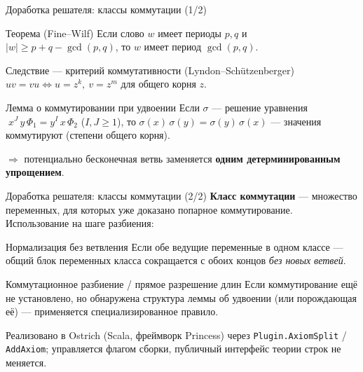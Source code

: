 \documentclass[aspectratio=169,11pt]{beamer}
\renewcommand{\ge}{\geqslant}
\begin{document}
\begin{frame}{Доработка решателя: классы коммутации (1/2)}
  \begin{block}{Теорема (Fine--Wilf)}
    Если слово $w$ имеет периоды $p,q$ и $|w|\ge p+q-\gcd(p,q)$, то $w$ имеет
    период $\gcd(p,q)$.
  \end{block}

  \begin{block}{Следствие --- критерий коммутативности (Lyndon--Sch\"utzenberger)}
    $uv=vu \iff u=z^k,\ v=z^m$ для общего корня $z$.
  \end{block}

  \begin{exampleblock}{Лемма о коммутировании при удвоении}
    Если $\sigma$ --- решение уравнения
    $\;x^{J}\,y\,\Phi_1 = y^{I}\,x\,\Phi_2$ ($I,J\ge 1$), то
    $\sigma(x)\,\sigma(y)=\sigma(y)\,\sigma(x)$ --- значения коммутируют
    (степени общего корня).
  \end{exampleblock}

  \centering\scriptsize$\Rightarrow$ потенциально бесконечная ветвь заменяется
  \textbf{одним детерминированным упрощением}.
\end{frame}

\begin{frame}{Доработка решателя: классы коммутации (2/2)}
  \textbf{Класс коммутации} --- множество переменных, для которых уже доказано
  попарное коммутирование. Использование на шаге разбиения:

  \medskip
  \begin{block}{Нормализация без ветвления}
    Если обе ведущие переменные в одном классе --- общий блок переменных класса
    сокращается с обоих концов \emph{без новых ветвей}.
  \end{block}

  \begin{block}{Коммутационное разбиение / прямое разрешение длин}
    Если коммутирование ещё не установлено, но обнаружена структура леммы об
    удвоении (или порождающая её) --- применяется специализированное правило.
  \end{block}

  \medskip
  \footnotesize Реализовано в Ostrich (Scala, фреймворк Princess) через
  \texttt{Plugin.AxiomSplit} / \texttt{AddAxiom}; управляется флагом сборки,
  публичный интерфейс теории строк не меняется.
\end{frame}
\end{document}
